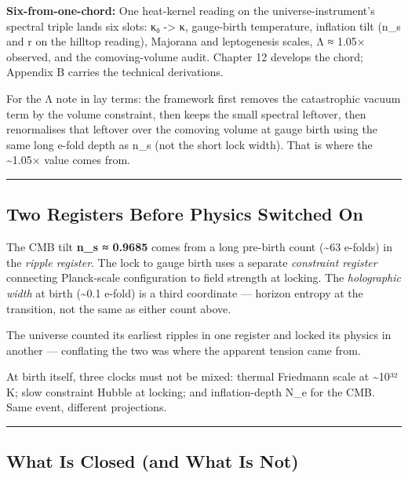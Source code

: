 \documentclass[
  11pt,
]{article}
\begin{document}
\textbf{Six-from-one-chord:} One heat-kernel reading on the
universe-instrument's spectral triple lands six slots: κ₀
-\textgreater{} κ, gauge-birth temperature, inflation tilt (n\_s and r
on the hilltop reading), Majorana and leptogenesis scales, Λ ≈ 1.05×
observed, and the comoving-volume audit. Chapter 12 develops the chord;
Appendix B carries the technical derivations.

For the Λ note in lay terms: the framework first removes the
catastrophic vacuum term by the volume constraint, then keeps the small
spectral leftover, then renormalises that leftover over the comoving
volume at gauge birth using the same long e-fold depth as n\_s (not the
short lock width). That is where the \textasciitilde1.05× value comes
from.

\begin{center}\rule{0.5\linewidth}{0.5pt}\end{center}

\subsection{Two Registers Before Physics Switched
On}\label{two-registers-before-physics-switched-on}

The CMB tilt \textbf{n\_s ≈ 0.9685} comes from a long pre-birth count
(\textasciitilde63 e-folds) in the \emph{ripple register}. The lock to
gauge birth uses a separate \emph{constraint register} connecting
Planck-scale configuration to field strength at locking. The
\emph{holographic width} at birth (\textasciitilde0.1 e-fold) is a third
coordinate --- horizon entropy at the transition, not the same as either
count above.

The universe counted its earliest ripples in one register and locked its
physics in another --- conflating the two was where the apparent tension
came from.

At birth itself, three clocks must not be mixed: thermal Friedmann scale
at \textasciitilde10³² K; slow constraint Hubble at locking; and
inflation-depth N\_e for the CMB. Same event, different projections.

\begin{center}\rule{0.5\linewidth}{0.5pt}\end{center}

\subsection{What Is Closed (and What Is
Not)}\label{what-is-closed-and-what-is-not}
\end{document}
